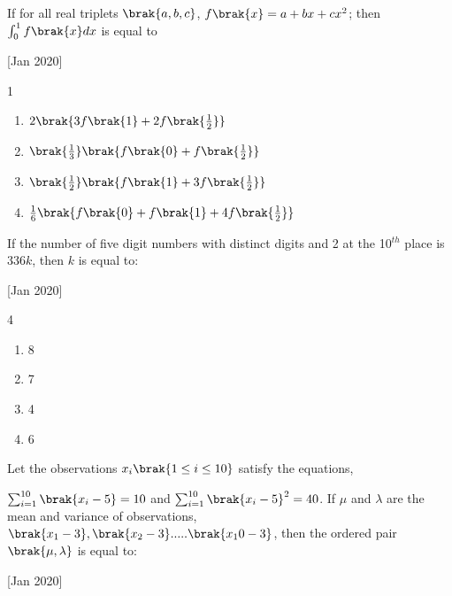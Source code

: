  
    \item If for all real triplets $\brak{a, b, c}$, $f\brak{x}=a+bx+cx^2$; then $\int_0^1f\brak{x}dx$ is equal to
    
    \hfill{[Jan 2020]}

        \begin{multicols}{1}
            \begin{enumerate}
                \item $2\brak{3f\brak{1}+ 2f\brak{\frac{1}{2}}}$
                \item $\brak{\frac{1}{3}}\brak{f\brak{0}+f\brak{\frac{1}{2}}}$
                \item $\brak{\frac{1}{2}}\brak{f\brak{1}+3f\brak{\frac{1}{2}}}$
                \item ${\frac{1}{6}}\brak{f\brak{0}+f\brak{1}+4f\brak{\frac{1}{2}}}$
            \end{enumerate}
        \end{multicols}

    \item If the number of five digit numbers with distinct digits and 2 at the 10$^{th}$ place is $336k$, then $k$ is equal to:
    
    \hfill{[Jan 2020]}

		\begin{multicols}{4}
			\begin{enumerate}
				\item 8
				\item 7
				\item 4
				\item 6
			\end{enumerate}
		\end{multicols}

    \item Let the observations $x_i\brak{1\leq i \leq 10}$ satisfy the equations,

    $\sum_{i=1}^{10} \brak{x_i - 5}=10$
    and
    $\sum_{i=1}^{10} \brak{x_i-5}^2=40$.
    If $\mu$ and $\lambda$ are the mean and variance of observations, $\brak{x_1-3}, \brak{x_2-3}.....\brak{x_10-3}$, then the ordered pair $\brak{\mu, \lambda}$ is equal to:
    
    \hfill{[Jan 2020]}

